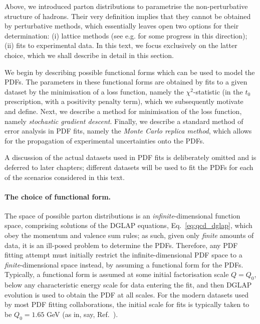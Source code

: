 \documentclass[withindex,glossary]{cam-thesis}
\begin{document}
Above, we introduced parton distributions to parametrise the non-perturbative structure of hadrons. Their very definition implies that they cannot be obtained by perturbative methods, which essentially leaves open two options for their determination: (i) lattice methods (see e.g. \cite{Cichy:2019ebf} for some progress in this direction); (ii) fits to experimental data. In this text, we focus exclusively on the latter choice, which we shall describe in detail in this section.

We begin by describing possible functional forms which can be used to model the PDFs. The parameters in these functional forms are obtained by fits to a given dataset by the minimisation of a loss function, namely the $\chi^2$-statistic (in the $t_0$ prescription, with a positivity penalty term), which we subsequently motivate and define. Next, we describe a method for minimisation of the loss function, namely \textit{stochastic gradient descent}. Finally, we describe a standard method of error analysis in PDF fits, namely the \textit{Monte Carlo replica method}, which allows for the propagation of experimental uncertainties onto the PDFs. 

A discussion of the actual datasets used in PDF fits is deliberately omitted and is deferred to later chapters; different datasets will be used to fit the PDFs for each of the scenarios considered in this text.

\paragraph{The choice of functional form.} The space of possible parton distributions is an \textit{infinite}-dimensional function space, comprising solutions of the DGLAP equations, Eq.~\eqref{eq:qcd_dglap}, which obey the momentum and valence sum rules; as such, given only \textit{finite} amounts of data, it is an ill-posed problem to determine the PDFs. Therefore, any PDF fitting attempt must initially restrict the infinite-dimensional PDF space to a \textit{finite}-dimensional space instead, by assuming a functional form for the PDFs. Typically, a functional form is assumed at some initial factorisation scale $Q = Q_0$, below any characteristic energy scale for data entering the fit, and then DGLAP evolution is used to obtain the PDF at all scales. For the modern datasets used by most PDF fitting collaborations, the initial scale for fits is typically taken to be $Q_0 = 1.65$ GeV (as in, say, Ref.~\cite{NNPDF:2021njg}).
\end{document}
